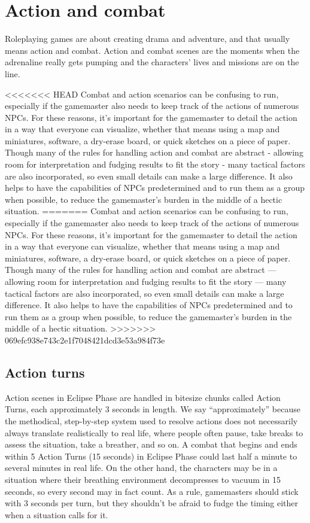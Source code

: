 
\chapter{Action and combat}
\label{chap:action-combat}

Roleplaying games are about creating drama and adventure, and that usually means action and combat. Action and combat scenes are the moments when the adrenaline really gets pumping and the characters’ lives and missions are on the line.

<<<<<<< HEAD
Combat and action scenarios can be confusing to run, especially if the gamemaster also needs to keep track of the actions of numerous NPCs. For these reasons, it’s important for the gamemaster to detail the action in a way that everyone can visualize, whether that means using a map and miniatures, software, a dry-erase board, or quick sketches on a piece of paper. Though many of the rules for handling action and combat are abstract - allowing room for interpretation and fudging results to fit the story - many tactical factors are also incorporated, so even small details can make a large difference. It also helps to have the capabilities of NPCs predetermined and to run them as a group when possible, to reduce the gamemaster’s burden in the middle of a hectic situation.
=======
Combat and action scenarios can be confusing to run, especially if the gamemaster also needs to keep track of the actions of numerous NPCs. For these reasons, it’s important for the gamemaster to detail the action in a way that everyone can visualize, whether that means using a map and miniatures, software, a dry-erase board, or quick sketches on a piece of paper. Though many of the rules for handling action and combat are abstract --- allowing room for interpretation and fudging results to fit the story --- many tactical factors are also incorporated, so even small details can make a large difference. It also helps to have the capabilities of NPCs predetermined and to run them as a group when possible, to reduce the gamemaster’s burden in the middle of a hectic situation.
>>>>>>> 069efc938e743c2e1f7048421dcd3e53a984f73e


\section{Action turns}
\label{sec:combat-action-turns}

Action scenes in Eclipse Phase are handled in bitesize chunks called Action Turns, each approximately 3 seconds in length. We say ``approximately'' because the methodical, step-by-step system used to resolve actions does not necessarily always translate realistically to real life, where people often pause, take breaks to assess the situation, take a breather, and so on. A combat that begins and ends within 5 Action Turns (15 seconds) in Eclipse Phase could last half a minute to several minutes in real life. On the other hand, the characters may be in a situation where their breathing environment decompresses to vacuum in 15 seconds, so every second may in fact count. As a rule, gamemasters should stick with 3 seconds per turn, but they shouldn’t be afraid to fudge the timing either when a situation calls for it.

